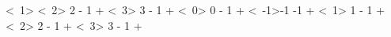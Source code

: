\par\noindent \CurrentFile
\mySection<~1>{         \myRLTVLevelBaseExpected}
\mySection<~2>{ 2 - 1 + \myRLTVLevelBaseExpected}
\mySection<~3>{ 3 - 1 + \myRLTVLevelBaseExpected}
\mySection<~0>{ 0 - 1 + \myRLTVLevelBaseExpected}
\mySection<~-1>{-1 -1 + \myRLTVLevelBaseExpected}
\mySection<~1>{ 1 - 1 + \RLTVLevelBase}
\mySection<~2>{ 2 - 1 + \RLTVLevelBase}
\mySection<~3>{ 3 - 1 + \RLTVLevelBase}
